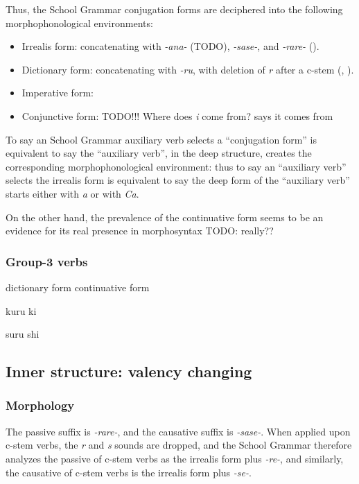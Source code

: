\documentclass[UTF8, a4paper, oneside, scheme=plain]{ctexart}
\newcommand{\corpus}[1]{\emph{#1}}
\begin{document}
Thus, the School Grammar conjugation forms are deciphered 
into the following morphophonological environments:
\begin{itemize}
    \item Irrealis form: concatenating with \corpus{-ana-} (TODO), 
    \corpus{-sase-}, and \corpus{-rare-} (). 
    \item Dictionary form: concatenating with \corpus{-ru},
    with deletion of \corpus{r} after a c-stem (, ).
    \item Imperative form:
    \item Conjunctive form: TODO!!! Where does \corpus{i} come from?
    \citet{volpe2005japanese} says it comes from 
\end{itemize}
To say an School Grammar auxiliary verb selects a ``conjugation form''
is equivalent to say the ``auxiliary verb'', in the deep structure,
creates the corresponding morphophonological environment:
thus to say an ``auxiliary verb'' selects the irrealis form 
is equivalent to say the deep form of the ``auxiliary verb'' 
starts either with \corpus{a} or with \corpus{Ca}.

On the other hand, the prevalence of the continuative form seems to be an evidence 
for its real presence in morphosyntax TODO: really??

\subsubsection{Group-3 verbs}

dictionary form continuative form 

kuru ki 

suru shi

\subsection{Inner structure: valency changing}\label{sec:valency-changing}

\subsubsection{Morphology}\label{sec:valency-changing-form}

The passive suffix is \corpus{-rare-},
and the causative suffix is \corpus{-sase-}.
When applied upon c-stem verbs,
the \corpus{r} and \corpus{s} sounds are dropped,
and the School Grammar therefore analyzes 
the passive of c-stem verbs as the irrealis form plus \corpus{-re-},
and similarly,
the causative of c-stem verbs is the irrealis form plus \corpus{-se-}.
\end{document}
